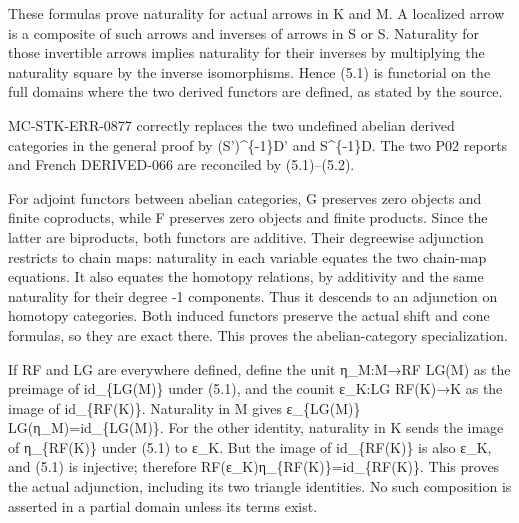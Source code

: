 \documentclass[11pt]{article}
\begin{document}
These formulas prove naturality for actual arrows in K and M. A localized arrow is a composite of such arrows and inverses of arrows in S or S\textquotesingle. Naturality for those invertible arrows implies naturality for their inverses by multiplying the naturality square by the inverse isomorphisms. Hence (5.1)\allowbreak{} is functorial on the full domains where the two derived functors are defined,\allowbreak{} as stated by the source.

MC-STK-ERR-0877 correctly replaces the two undefined abelian derived categories in the general proof by (S')\allowbreak{}\textasciicircum{}\{-1\}D' and S\^{}\{-1\}D. The two P02 reports and French DERIVED-066 are reconciled by (5.1)\allowbreak{}–\allowbreak{}(5.2)\allowbreak{}.

For adjoint functors between abelian categories,\allowbreak{} G preserves zero objects and finite coproducts,\allowbreak{} while F preserves zero objects and finite products. Since the latter are biproducts,\allowbreak{} both functors are additive. Their degreewise adjunction restricts to chain maps:\allowbreak{} naturality in each variable equates the two chain-map equations. It also equates the homotopy relations,\allowbreak{} by additivity and the same naturality for their degree -1 components. Thus it descends to an adjunction on homotopy categories. Both induced functors preserve the actual shift and cone formulas,\allowbreak{} so they are exact there. This proves the abelian-category specialization.

If RF and LG are everywhere defined,\allowbreak{} define the unit η\_\allowbreak{}M:\allowbreak{}M\allowbreak{}→RF LG(M)\allowbreak{} as the preimage of id\_\allowbreak{}\{LG(M)\allowbreak{}\} under (5.1)\allowbreak{},\allowbreak{} and the counit ε\_\allowbreak{}K:\allowbreak{}LG RF(K)\allowbreak{}\allowbreak{}→K as the image of id\_\allowbreak{}\{RF(K)\allowbreak{}\}. Naturality in M gives ε\_\allowbreak{}\{LG(M)\allowbreak{}\} LG(η\_\allowbreak{}M)\allowbreak{}\allowbreak{}=id\_\allowbreak{}\{LG(M)\allowbreak{}\}. For the other identity,\allowbreak{} naturality in K sends the image of η\_\allowbreak{}\{RF(K)\allowbreak{}\} under (5.1)\allowbreak{} to ε\_\allowbreak{}K. But the image of id\_\allowbreak{}\{RF(K)\allowbreak{}\} is also ε\_\allowbreak{}K,\allowbreak{} and (5.1)\allowbreak{} is injective; therefore RF(ε\_\allowbreak{}K)\allowbreak{}η\_\allowbreak{}\{RF(K)\allowbreak{}\}\allowbreak{}=id\_\allowbreak{}\{RF(K)\allowbreak{}\}. This proves the actual adjunction,\allowbreak{} including its two triangle identities. No such composition is asserted in a partial domain unless its terms exist.
\end{document}
